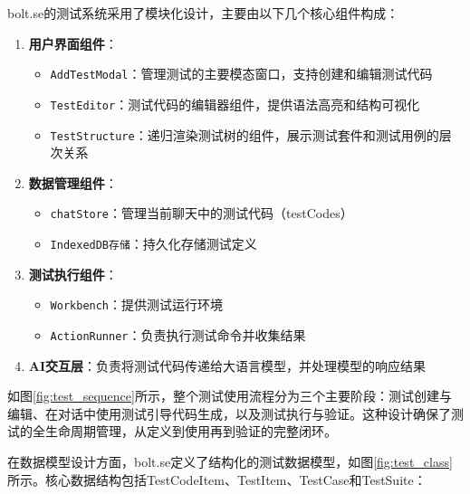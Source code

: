 bolt.se的测试系统采用了模块化设计，主要由以下几个核心组件构成：

\begin{enumerate}
  \item \textbf{用户界面组件}：
    \begin{itemize}
      \item \texttt{AddTestModal}：管理测试的主要模态窗口，支持创建和编辑测试代码
      \item \texttt{TestEditor}：测试代码的编辑器组件，提供语法高亮和结构可视化
      \item \texttt{TestStructure}：递归渲染测试树的组件，展示测试套件和测试用例的层次关系
    \end{itemize}
  
  \item \textbf{数据管理组件}：
    \begin{itemize}
      \item \texttt{chatStore}：管理当前聊天中的测试代码（testCodes）
      \item \texttt{IndexedDB存储}：持久化存储测试定义
    \end{itemize}
  
  \item \textbf{测试执行组件}：
    \begin{itemize}
      \item \texttt{Workbench}：提供测试运行环境
      \item \texttt{ActionRunner}：负责执行测试命令并收集结果
    \end{itemize}
  
  \item \textbf{AI交互层}：负责将测试代码传递给大语言模型，并处理模型的响应结果
\end{enumerate}

如图\ref{fig:test_sequence}所示，整个测试使用流程分为三个主要阶段：测试创建与编辑、在对话中使用测试引导代码生成，以及测试执行与验证。这种设计确保了测试的全生命周期管理，从定义到使用再到验证的完整闭环。

在数据模型设计方面，bolt.se定义了结构化的测试数据模型，如图\ref{fig:test_class}所示。核心数据结构包括TestCodeItem、TestItem、TestCase和TestSuite：

